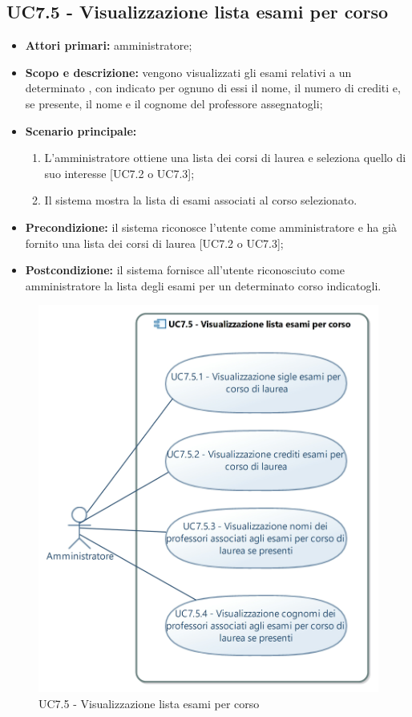 \documentclass[AnalisiDeiRequisiti.tex]{subfiles}
\begin{document}
\subsection{UC7.5 - Visualizzazione lista esami per corso}
\begin{itemize}
	\item \textbf{Attori primari:} amministratore;
	\item \textbf{Scopo e descrizione:} vengono visualizzati gli esami relativi a un determinato , con indicato per ognuno di essi il nome, il numero di crediti e, se presente, il nome e il cognome del professore assegnatogli;
	\item \textbf{Scenario principale:}
	\begin{enumerate}
		\item L'amministratore ottiene una lista dei corsi di laurea e seleziona quello di suo interesse [UC7.2 o UC7.3];
		\item Il sistema mostra la lista di esami associati al corso selezionato.
	\end{enumerate}
	\item \textbf{Precondizione:} il sistema riconosce l'utente come amministratore e ha già fornito una lista dei corsi di laurea [UC7.2 o UC7.3]; 
	\item \textbf{Postcondizione:} il sistema fornisce all'utente riconosciuto come amministratore la lista degli esami per un determinato corso indicatogli.
\end{itemize}
\begin{figure}[H]
	\centering
	\includegraphics[width=0.8\linewidth]{UC7_5.jpg}
	\caption{UC7.5 - Visualizzazione lista esami per corso}
	\label{fig:UC7.5 - Visualizzazione lista esami per corso}
\end{figure}
\end{document}

